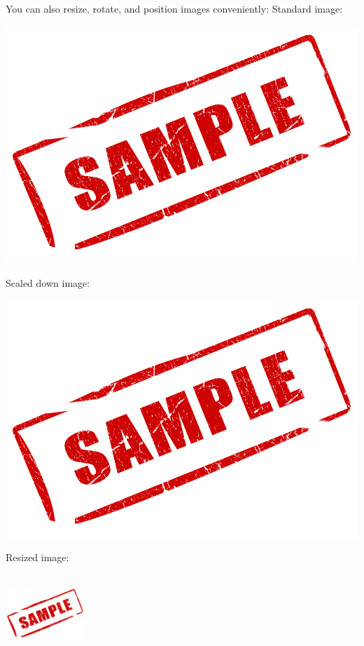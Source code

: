 \documentclass[12pt, letterpaper]{article}
\begin{document}
You can also resize, rotate, and position images conveniently:
Standard image:
\begin{center}
\includegraphics{sampleLarge}
\end{center}

Scaled down image:
\begin{center}
\includegraphics[scale=0.5]{sampleLarge}
\end{center}

\newpage
Resized image:
\begin{center}
\includegraphics[width=3cm, height=3cm]{sampleLarge}
\end{center}
\end{document}
